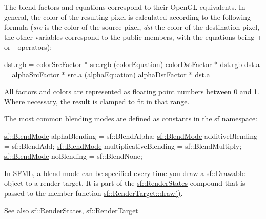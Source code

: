 The blend factors and equations correspond to their Open\+GL equivalents. In general, the color of the resulting pixel is calculated according to the following formula ({\itshape src} is the color of the source pixel, {\itshape dst} the color of the destination pixel, the other variables correspond to the public members, with the equations being + or -\/ operators)\+: 
\begin{DoxyCode}
dst.rgb = \hyperlink{structsf_1_1_blend_mode_a32d1a55dbfada86a06d9b881dc8ccf7b}{colorSrcFactor} * src.rgb (\hyperlink{structsf_1_1_blend_mode_aed12f06eb7f50a1b95b892b0964857b1}{colorEquation}) 
      \hyperlink{structsf_1_1_blend_mode_adee68ee59e7f1bf71d12db03d251104d}{colorDstFactor} * dst.rgb
dst.a   = \hyperlink{structsf_1_1_blend_mode_aa94e44f8e1042a7357e8eff78c61a1be}{alphaSrcFactor} * src.a   (\hyperlink{structsf_1_1_blend_mode_a68f5a305e0912946f39ba6c9265710c4}{alphaEquation}) 
      \hyperlink{structsf_1_1_blend_mode_aaf85b6b7943181cc81745569c4851e4e}{alphaDstFactor} * dst.a
\end{DoxyCode}
 All factors and colors are represented as floating point numbers between 0 and 1. Where necessary, the result is clamped to fit in that range.

The most common blending modes are defined as constants in the sf namespace\+:


\begin{DoxyCode}
\hyperlink{structsf_1_1_blend_mode}{sf::BlendMode} alphaBlending          = sf::BlendAlpha;
\hyperlink{structsf_1_1_blend_mode}{sf::BlendMode} additiveBlending       = sf::BlendAdd;
\hyperlink{structsf_1_1_blend_mode}{sf::BlendMode} multiplicativeBlending = sf::BlendMultiply;
\hyperlink{structsf_1_1_blend_mode}{sf::BlendMode} noBlending             = sf::BlendNone;
\end{DoxyCode}


In S\+F\+ML, a blend mode can be specified every time you draw a \hyperlink{classsf_1_1_drawable}{sf\+::\+Drawable} object to a render target. It is part of the \hyperlink{classsf_1_1_render_states}{sf\+::\+Render\+States} compound that is passed to the member function \hyperlink{classsf_1_1_render_target_a12417a3bcc245c41d957b29583556f39}{sf\+::\+Render\+Target\+::draw()}.

\begin{DoxySeeAlso}{See also}
\hyperlink{classsf_1_1_render_states}{sf\+::\+Render\+States}, \hyperlink{classsf_1_1_render_target}{sf\+::\+Render\+Target} 
\end{DoxySeeAlso}


